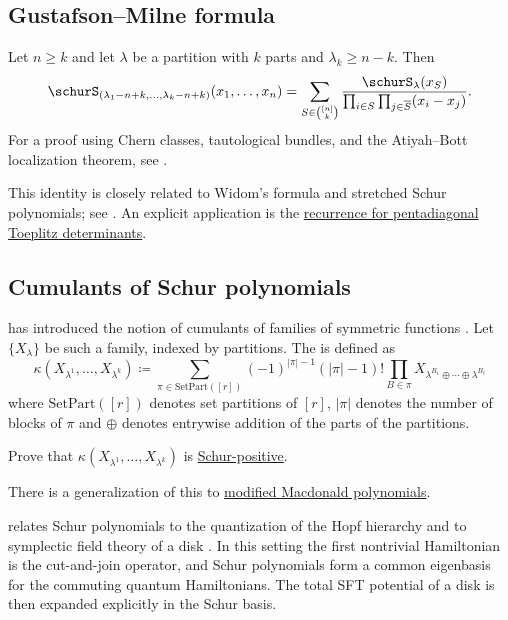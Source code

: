 \subsection[schurGustafsonMilne]{Gustafson--Milne formula}

Let $n\geq k$ and let $\lambda$ be a partition with $k$ parts and
$\lambda_k\geq n-k$. Then
\[
\schurS_{(\lambda_1-n+k,\dotsc,\lambda_k-n+k)}(x_1,\dotsc,x_n)
 =\sum_{S \in \binom{[n]}{k}} \frac{\schurS_\lambda(x_S)}{\prod_{i\in S} \prod_{j\in \overline{S}} (x_i-x_j)}.
\]
For a proof using Chern classes, tautological bundles, and the Atiyah--Bott localization theorem,
see \cite[Thm.~7.1]{FeherRimanyiNemethi2012}.

This identity is closely related to Widom's formula
and stretched Schur polynomials; see
\cite{Alexandersson2012Toeplitz,Alexandersson2014stretched}.
An explicit application is the
\hyperref[toeplitzReciprocalRecurrence]{recurrence for pentadiagonal Toeplitz determinants}.

\subsection[schurCumulants]{Cumulants of Schur polynomials}

 has introduced the notion of cumulants of families of symmetric functions \cite{Dolega2019}.
Let $\{X_\lambda\}$ be such a family, indexed by partitions.
The \label{schurCumulant} is defined as
\[
\kappa( X_{\lambda^1}, \dotsc, X_{\lambda^k} ) \coloneqq
\sum_{\pi \in \mathrm{SetPart}([r])}
(-1)^{|\pi|-1}(|\pi|-1)!
\prod_{ B \in \pi }
X_{\lambda^{B_1} \oplus \dotsb \oplus \lambda^{B_\ell}}
\]
where $\mathrm{SetPart}([r])$ denotes set partitions of $[r]$, $|\pi|$ denotes the number of blocks of $\pi$
and $\oplus$ denotes entrywise addition of the parts of the partitions.


\begin{problem}[M. Dołęga, 2017+]
Prove that $\kappa( X_{\lambda^1}, \dotsc, X_{\lambda^k} )$ is \hyperref[schurPositivity]{Schur-positive}.
\end{problem}

There is a generalization of this to \hyperref[macdonaldHCumulants]{modified Macdonald polynomials}.

 relates Schur polynomials to the quantization of the
Hopf hierarchy and to symplectic field theory of a disk
\cite{Dubrovin2015}.  In this setting the first nontrivial Hamiltonian is the
cut-and-join operator, and Schur polynomials form a common eigenbasis for the
commuting quantum Hamiltonians.  The total SFT potential of a disk is then
expanded explicitly in the Schur basis.
